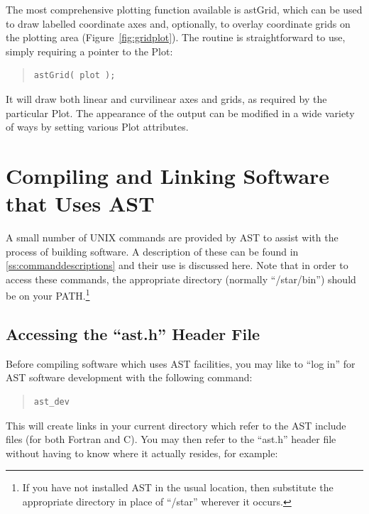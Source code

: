 \documentclass[twoside,11pt]{article}
\newcommand{\htmlref}[2]{#1}
\newcommand{\appref}[1]{Appendix~\ref{#1}}
\renewcommand{\appref}[1]{\ref{#1}}
\begin{document}
The most comprehensive plotting function available is \htmlref{astGrid}{astGrid}, which
can be used to draw labelled coordinate axes and, optionally, to
overlay coordinate grids on the plotting area
(Figure~\ref{fig:gridplot}). The routine is straightforward to use,
simply requiring a pointer to the \htmlref{Plot}{Plot}:

\begin{quote}
\small
\begin{verbatim}
astGrid( plot );
\end{verbatim}
\normalsize
\end{quote}

It will draw both linear and curvilinear axes and grids, as required
by the particular Plot. The appearance of the output can be modified
in a wide variety of ways by setting various Plot attributes.

\cleardoublepage
%
\section{Compiling and Linking Software that Uses AST}

A small number of UNIX commands are provided by AST to assist with the
process of building software. A description of these can be found in
\appref{ss:commanddescriptions} and their use is discussed here.  Note
that in order to access these commands, the appropriate directory
(normally ``/star/bin'') should be on your PATH.\footnote{If you have
not installed AST in the usual location, then substitute the
appropriate directory in place of ``/star'' wherever it occurs.}

\subsection{\label{ss:accessingheaderfile}Accessing the ``ast.h'' Header File}

Before compiling software which uses AST facilities, you may like to
``log in'' for AST software development with the following command:

\begin{quote}
\small
\begin{verbatim}
ast_dev
\end{verbatim}
\normalsize
\end{quote}

This will create links in your current directory which refer to the
AST include files (for both Fortran and C).
You may then refer to the ``ast.h'' header file without having to know
where it actually resides, for example:
\end{document}
